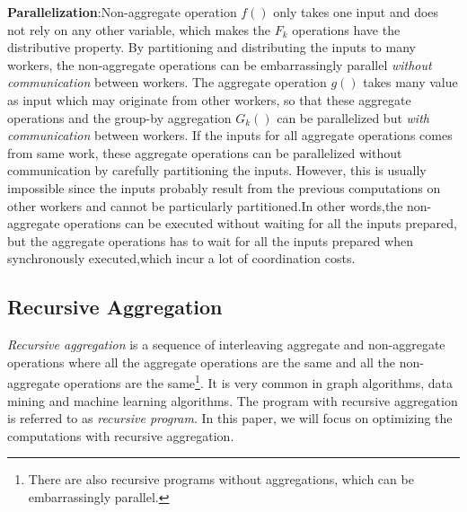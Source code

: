 
\textbf{Parallelization}:Non-aggregate operation $f()$ only takes one input and does not rely on any other variable, which makes the $F_k$ operations have the distributive property. By partitioning and distributing the inputs to many workers, the non-aggregate operations can be embarrassingly parallel \emph{without communication} between workers. The aggregate operation $g()$ takes many value as input which may originate from other workers, so that these aggregate operations and the group-by aggregation $G_k()$ can be parallelized but \emph{with communication} between workers. If the inputs for all aggregate operations comes from same work, these aggregate operations can be parallelized without communication by carefully partitioning the inputs. However, this is usually impossible since the inputs probably result from the previous computations on other workers and cannot be particularly partitioned.In other words,the non-aggregate operations can be executed without waiting for all the inputs prepared, but the aggregate operations has to wait for all the inputs prepared when synchronously executed,which incur a lot of coordination costs.


\subsection{Recursive Aggregation}


\emph{Recursive aggregation} is a sequence of interleaving aggregate and non-aggregate operations where all the aggregate operations are the same and all the non-aggregate operations are the same\footnote{There are also recursive programs without aggregations, which can be embarrassingly parallel.}. It is very common in graph algorithms, data mining and machine learning algorithms. The program with recursive aggregation is referred to as \emph{recursive program}. In this paper, we will focus on optimizing the computations with recursive aggregation.

